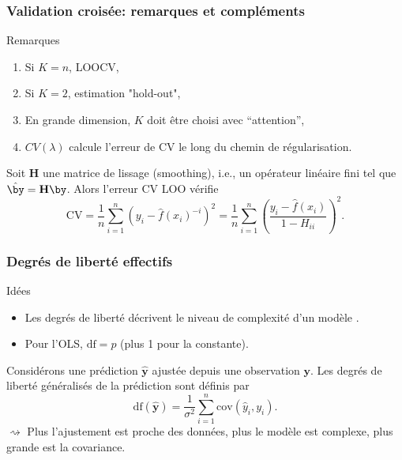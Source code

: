 \documentclass{beamer}\usepackage[]{graphicx}\usepackage[]{color}
\begin{document}
\begin{frame}
  \frametitle{Validation croisée: remarques et compléments}

  \begin{block}{Remarques}
    \begin{enumerate}
    \item Si $K=n$, LOOCV,
    \item Si $K=2$, estimation "hold-out",
    \item En grande dimension,  $K$ doit être choisi avec ``attention'',
    \item $CV(\lambda)$ calcule l'erreur de CV le long du chemin de régularisation.
    \end{enumerate}
  \end{block}

  \vfill
  
  \begin{proposition} Soit $\mathbf{H}$ une matrice de lissage (smoothing), i.e.,
    un opérateur linéaire fini tel que  $\hat{\by} = \mathbf{H} \by$. Alors l'erreur CV LOO vérifie
    \begin{equation*}
      \mathrm{CV}     =  \frac{1}{n}\sum_{i=1}^n
      (y_i - \hat{f}(x_i)^{-i})^2 = \frac{1}{n}\sum_{i=1}^n
      \left(\frac{y_i - \hat{f}(x_i)}{1-H_{ii}}\right)^2.
    \end{equation*}
  \end{proposition}

\end{frame}

\begin{frame}
  \frametitle{Degrés de liberté effectifs}

\begin{block}{Idées}
  \begin{itemize}
  \item Les degrés de liberté décrivent le  niveau de complexité d'un modèle .
  \item Pour l'OLS, $\mathrm{df} = p$ (plus 1 pour la constante).
  \end{itemize}
\end{block}

  \vfill

  \begin{definitionf} Considérons une prédiction 
    $\hat{\mathbf{y}}$ ajustée depuis une observation $\mathbf{y}$. Les degrés de liberté généralisés de la prédiction sont définis par 
    \begin{equation*}
      \mathrm{df}(\hat{\mathbf{y}})    =    \frac{1}{\sigma^2}
      \sum_{i=1}^n \mathrm{cov}(\hat{y}_i,y_i).
    \end{equation*}
    $\rightsquigarrow$ Plus l'ajustement est proche des données, plus le modèle est complexe, plus grande est la covariance.
  \end{definitionf}

\end{frame}
\end{document}
